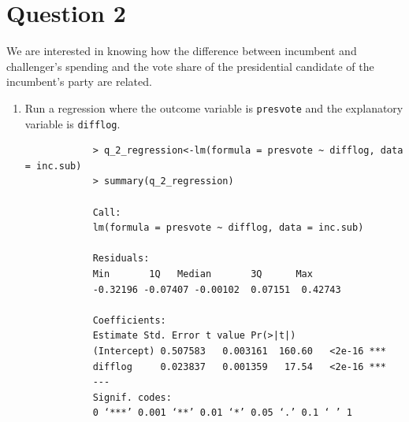 \documentclass[12pt,letterpaper]{article}
\begin{document}
\newpage

\section*{Question 2}
\noindent We are interested in knowing how the difference between incumbent and challenger's spending and the vote share of the presidential candidate of the incumbent's party are related.	\vspace{.25cm}
	\begin{enumerate}
		\item Run a regression where the outcome variable is \texttt{presvote} and the explanatory variable is \texttt{difflog}.	\\
		\begin{verbatim}
			> q_2_regression<-lm(formula = presvote ~ difflog, data = inc.sub)
			> summary(q_2_regression)
			
			Call:
			lm(formula = presvote ~ difflog, data = inc.sub)
			
			Residuals:
			Min       1Q   Median       3Q      Max 
			-0.32196 -0.07407 -0.00102  0.07151  0.42743 
			
			Coefficients:
			Estimate Std. Error t value Pr(>|t|)    
			(Intercept) 0.507583   0.003161  160.60   <2e-16 ***
			difflog     0.023837   0.001359   17.54   <2e-16 ***
			---
			Signif. codes:  
			0 ‘***’ 0.001 ‘**’ 0.01 ‘*’ 0.05 ‘.’ 0.1 ‘ ’ 1
			

\end{verbatim}
\end{enumerate}
\end{document}
